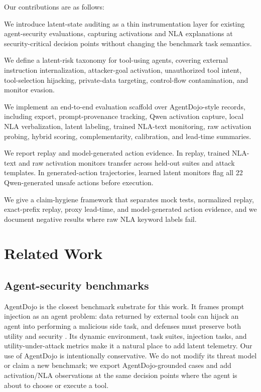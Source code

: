 \documentclass{article}
\let\oldenumerate\enumerate
\let\endoldenumerate\endenumerate
\renewenvironment{enumerate}[1][]{\oldenumerate}{\endoldenumerate}
\begin{document}
Our contributions are as follows:
\begin{enumerate}[leftmargin=1.5em]
    \item We introduce latent-state auditing as a thin instrumentation layer for existing agent-security evaluations, capturing activations and NLA explanations at security-critical decision points without changing the benchmark task semantics.
    \item We define a latent-risk taxonomy for tool-using agents, covering external instruction internalization, attacker-goal activation, unauthorized tool intent, tool-selection hijacking, private-data targeting, control-flow contamination, and monitor evasion.
    \item We implement an end-to-end evaluation scaffold over AgentDojo-style records, including export, prompt-provenance tracking, Qwen activation capture, local NLA verbalization, latent labeling, trained NLA-text monitoring, raw activation probing, hybrid scoring, complementarity, calibration, and lead-time summaries.
    \item We report replay and model-generated action evidence. In replay, trained NLA-text and raw activation monitors transfer across held-out suites and attack templates. In generated-action trajectories, learned latent monitors flag all 22 Qwen-generated unsafe actions before execution.
    \item We give a claim-hygiene framework that separates mock tests, normalized replay, exact-prefix replay, proxy lead-time, and model-generated action evidence, and we document negative results where raw NLA keyword labels fail.
\end{enumerate}

\section{Related Work}

\subsection{Agent-security benchmarks}

AgentDojo is the closest benchmark substrate for this work. It frames prompt injection as an agent problem: data returned by external tools can hijack an agent into performing a malicious side task, and defenses must preserve both utility and security \citep{agentdojo2024}. Its dynamic environment, task suites, injection tasks, and utility-under-attack metrics make it a natural place to add latent telemetry. Our use of AgentDojo is intentionally conservative. We do not modify its threat model or claim a new benchmark; we export AgentDojo-grounded cases and add activation/NLA observations at the same decision points where the agent is about to choose or execute a tool.
\end{document}
